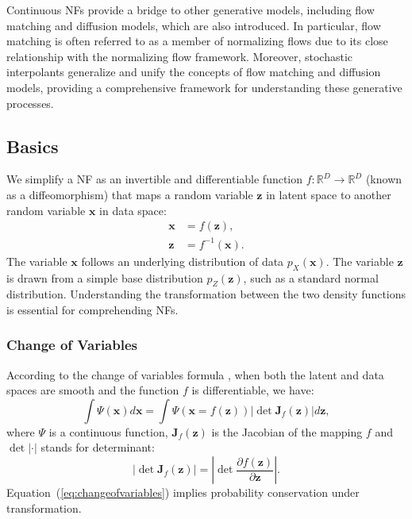 Continuous \acp{NF} provide a bridge to other generative models, including flow matching and diffusion models, which are also introduced. In particular, flow matching is often referred to as a member of normalizing flows due to its close relationship with the normalizing flow framework. Moreover, stochastic interpolants generalize and unify the concepts of flow matching and diffusion models, providing a comprehensive framework for understanding these generative processes.

\subsection{Basics}
We simplify a \ac{NF} as an invertible and differentiable function $f:\mathbb{R}^D\rightarrow\mathbb{R}^D$ (known as a diffeomorphism) that maps a random variable $\boldsymbol{z}$ in latent space to another random variable $\boldsymbol{x}$ in data space:
\begin{subequations}
    \begin{align}
        \label{eq:xfz}
        \boldsymbol{x} &= f(\boldsymbol{z}),\\
        \label{eq:zfx}
        \boldsymbol{z} &= f^{-1}(\boldsymbol{x}).
    \end{align}
\end{subequations}
The variable $\boldsymbol{x}$ follows an underlying distribution of data $p_X(\boldsymbol{x})$. The variable $\boldsymbol{z}$ is drawn from a simple base distribution $p_Z(\boldsymbol{z})$, such as a standard normal distribution. Understanding the transformation between the two density functions is essential for comprehending \acp{NF}. 
\subsubsection{Change of Variables}
According to the change of variables formula \citep{changeofvariables}, when both the latent and data spaces are smooth and the function $f$ is differentiable, we have:
\begin{equation}
    \label{eq:changeofvariables}
    \int \varPsi(\boldsymbol{x}) d\boldsymbol{x} = \int \varPsi(\boldsymbol{x}=f(\boldsymbol{z}))\left|\det\boldsymbol{J}_f(\boldsymbol{z})\right| d\boldsymbol{z},
\end{equation}
where $\varPsi$ is a continuous function, $\boldsymbol{J}_f(\boldsymbol{z})$ is the Jacobian of the mapping $f$ and $\det|\cdot|$ stands for determinant:
\begin{equation}
    \left|\det\boldsymbol{J}_f(\boldsymbol{z})\right|=\left|\det\frac{\partial f(\boldsymbol{z})}{\partial\boldsymbol{z}}\right|.
\end{equation}
Equation~(\ref{eq:changeofvariables}) implies probability conservation under transformation. 

